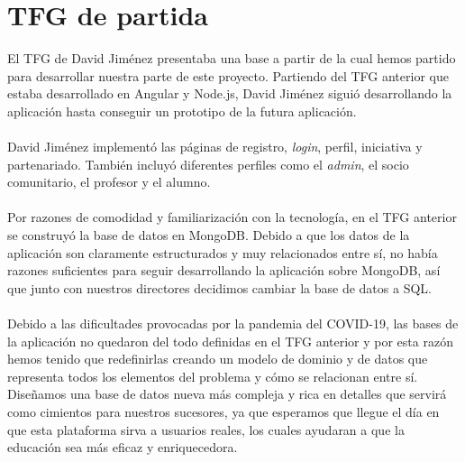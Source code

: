 \documentclass[11pt]{book}
\begin{document}
	
	\section{TFG de partida}
	El TFG de David Jiménez presentaba una base a partir de la cual hemos partido para desarrollar nuestra parte de este proyecto. Partiendo del TFG anterior que estaba desarrollado en Angular y Node.js, David Jiménez siguió desarrollando la aplicación hasta conseguir un prototipo de la futura aplicación.\\\\
	David Jiménez implementó las páginas de registro, \textit{login}, perfil, iniciativa y partenariado. También incluyó diferentes perfiles como el \textit{admin}, el socio comunitario, el profesor y el alumno.\\\\
	Por razones de comodidad y familiarización con la tecnología, en el TFG anterior se construyó la base de datos en MongoDB. Debido a que los datos de la aplicación son claramente estructurados y muy relacionados entre sí, no había razones suficientes para seguir desarrollando la aplicación sobre MongoDB, así que junto con nuestros directores decidimos cambiar la base de datos a SQL.\\\\
	Debido a las dificultades provocadas por la pandemia del COVID-19, las bases de la aplicación no quedaron del todo definidas en el TFG anterior y por esta razón hemos tenido que redefinirlas creando un modelo de dominio y de datos que representa todos los elementos del problema y cómo se relacionan entre sí. Diseñamos una base de datos nueva más compleja y rica en detalles que servirá como cimientos para nuestros sucesores, ya que esperamos que llegue el día en que esta plataforma sirva a usuarios reales, los cuales ayudaran a que la educación sea más eficaz y enriquecedora.
	
\end{document}
